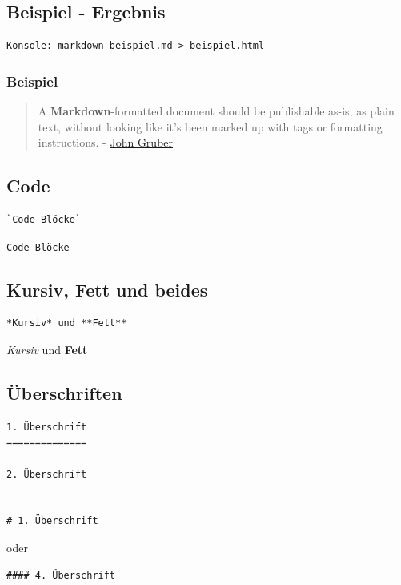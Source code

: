 \subsection{Beispiel - Ergebnis}

\begin{verbatim}
Konsole: markdown beispiel.md > beispiel.html
\end{verbatim}

\subsubsection{Beispiel}

\begin{quote}
A \textbf{Markdown}-formatted document should be publishable as-is, as
plain text, without looking like it's been marked up with tags or
formatting instructions. - \href{http://daringfireball.net/}{John
Gruber}
\end{quote}

\subsection{Code}

\begin{verbatim}
`Code-Blöcke`
\end{verbatim}

\texttt{Code-Blöcke}

\subsection{Kursiv, Fett und beides}

\begin{verbatim}
*Kursiv* und **Fett**
\end{verbatim}

\emph{Kursiv} und \textbf{Fett}

\subsection{Überschriften}

\begin{verbatim}
1. Überschrift
==============

2. Überschrift
--------------

# 1. Überschrift
\end{verbatim}

oder

\begin{verbatim}
#### 4. Überschrift
\end{verbatim}

